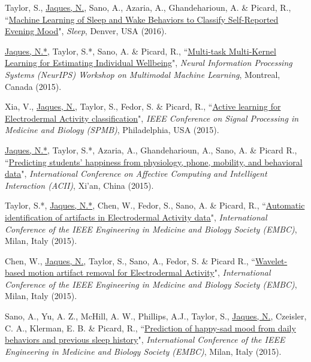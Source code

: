 \documentclass[paper=letter,fontsize=11pt]{scrartcl} %
\newcommand{\PaperEntry}[6]{
        \noindent #1, ``\href{#6}{#2}", \textit{#3}, #4 (#5).}
\begin{document}
\begin{etaremune}
\item \PaperEntry{Taylor, S., \underline{Jaques, N.}, Sano, A., Azaria, A., Ghandeharioun, A. \& Picard, R.}{Machine Learning of Sleep and Wake Behaviors to Classify Self-Reported Evening Mood}{Sleep}{Denver, USA}{2016}{https://affect.media.mit.edu/pdfs/16.Taylor-ClassifyingSelfReportedMood-SLEEP2016.pdf}

\item \PaperEntry{\underline{Jaques, N.*}, Taylor, S.*, Sano, A. \& Picard, R.}{Multi-task Multi-Kernel Learning for Estimating Individual Wellbeing}{Neural Information Processing Systems (NeurIPS) Workshop on Multimodal Machine Learning}{Montreal, Canada}{2015}{https://affect.media.mit.edu/pdfs/15.Jaques-etal-NIPSMMML.pdf}

\item \PaperEntry{Xia, V., \underline{Jaques, N.}, Taylor, S., Fedor, S. \& Picard, R.}{Active learning for Electrodermal Activity classification}{IEEE Conference on Signal Processing in Medicine and Biology (SPMB)}{Philadelphia, USA}{2015}{https://dspace.mit.edu/openaccess-disseminate/1721.1/109392}

\item \PaperEntry{\underline{Jaques, N.*}, Taylor, S.*, Azaria, A., Ghandeharioun, A., Sano, A. \& Picard R.}{Predicting students' happiness from physiology, phone, mobility, and behavioral data}{International Conference on Affective Computing and Intelligent Interaction (ACII)}{Xi'an, China}{2015}{https://www.ncbi.nlm.nih.gov/pmc/articles/PMC5431070/}

\item \PaperEntry{Taylor, S.*, \underline{Jaques, N.*}, Chen, W., Fedor, S., Sano, A. \& Picard, R.}{Automatic identification of artifacts in Electrodermal Activity data}{International Conference of the IEEE Engineering in Medicine and Biology Society (EMBC)}{Milan, Italy}{2015}{https://www.ncbi.nlm.nih.gov/pmc/articles/PMC5413200/}

\item \PaperEntry{Chen, W., \underline{Jaques, N.}, Taylor, S., Sano, A., Fedor, S. \& Picard R.}{Wavelet-based motion artifact removal for Electrodermal Activity}{International Conference of the IEEE Engineering in Medicine and Biology Society (EMBC)}{Milan, Italy}{2015}{https://www.ncbi.nlm.nih.gov/pmc/articles/PMC5413204/}

\item \PaperEntry{Sano, A., Yu, A. Z., McHill, A. W., Phillips, A.J., Taylor, S., \underline{Jaques, N.}, Czeisler, C. A., Klerman, E. B. \& Picard, R.}{Prediction of happy-sad mood from daily behaviors and previous sleep history}{International Conference of the IEEE Engineering in Medicine and Biology Society (EMBC)}{Milan, Italy}{2015}{https://www.ncbi.nlm.nih.gov/pmc/articles/PMC4768795/}


\end{etaremune}
\end{document}
